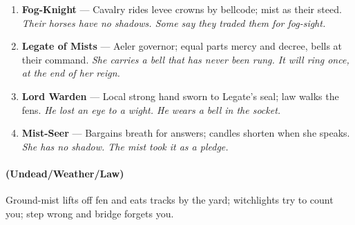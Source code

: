 \begin{enumerate}
\item[J] \textbf{Fog-Knight} --- Cavalry rides levee crowns by bellcode; mist as their steed.  
  \hfill \textit{Their horses have no shadows. Some say they traded them for fog-sight.}
\item[Q] \textbf{Legate of Mists} --- Aeler governor; equal parts mercy and decree, bells at their command. 
  \hfill \textit{She carries a bell that has never been rung. It will ring once, at the end of her reign.}
\item[K] \textbf{Lord Warden} --- Local strong hand sworn to Legate's seal; law walks the fens. 
  \hfill \textit{He lost an eye to a wight. He wears a bell in the socket.}
\item[A] \textbf{Mist-Seer} --- Bargains breath for answers; candles shorten when she speaks.  
  \hfill \textit{She has no shadow. The mist took it as a pledge.}
\end{enumerate}

\paragraph*{(Undead/Weather/Law)} Ground-mist lifts off fen and eats tracks by the yard; witchlights try to count you; step wrong and bridge forgets you.

